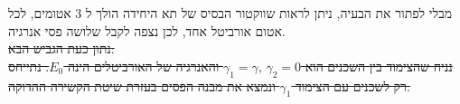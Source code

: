 \documentclass{article}
\begin{document}
\begin{Question}
מבלי לפתור את הבעיה, ניתן לראות שווקטור הבסיס של תא היחידה הולך ל 3 אטומים, לכל אטום אורביטל אחד, לכן נצפה לקבל שלושה פסי אנרגיה.\\
\sout{
נתון כעת הגביש הבא:\\
נניח שהצימוד בין השכנים הוא $\gamma_{1}=\gamma,\, \gamma_{2}=0$ והאנרגיה של האורביטלים הינה $E_{0}$. נתייחס רק לשכנים עם הצימוד $\gamma_{1}$ ונמצא את מבנה הפסים בעזרת שיטת הקשירה ההדוקה.\\}


\end{Question}
\end{document}
